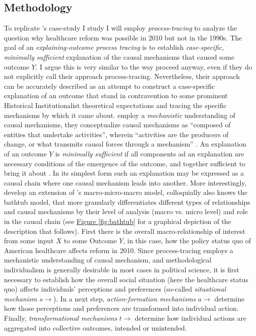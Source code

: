 \documentclass[11pt]{article}
\begin{document}
\subsection*{Methodology}

To replicate \citeauthor{Jacobs2014}'s \parencite*{Jacobs2014} case-study I study I will employ \textit{process-tracing} to analyze the question why healthcare reform was possible in 2010 but not in the 1990s. The goal of an \textit{explaining-outcome process tracing} \parencite[][]{Beach2019} is to establish \textit{case-specific}, \textit{minimally sufficient} explanation of the causal mechanisms that caused some outcome $Y$. I argue this is very similar to the way \textcite[][]{Jacobs2014} proceed anyway, even if they do not explicitly call their approach process-tracing. Nevertheless, their approach can be accurately described as an attempt to construct a case-specific explanation of an outcome that stand in contravention to some prominent Historical Institutionalist theoretical expectations and tracing the specific mechanisms by which it came about. \textcite[][]{Beach2019} employ a \textit{mechanistic} understanding of causal mechanisms, they conceptualize causal mechanisms as  \enquote{composed of entities that undertake activities}, wherein \enquote{activities are the producers of change, or what transmits causal forces through a mechanism} . An explanation of an outcome $Y$ is \textit{minimally sufficient} if all components ad an explanation are necessary conditions of the emergence of the outcome, and together sufficient to bring it about \parencite[see e.g.][]{Goertz2007}. In its simplest form such an explanation may be expressed as a causal chain where one causal mechanism leads into another. More interestingly, \textcite[][]{Hedström1998} develop an extension of \citeauthor[][]{Coleman1986}'s \parencite*{Coleman1986} macro-micro-macro model, colloquially also knows the bathtub model, that more granularly differentiates different types of relationships and causal mechanisms by their level of analysis (macro vs. micro level) and role in the causal chain (see \hyperref[fig:bathtub]{Figure \ref*{fig:bathtub}} for a graphical depiction of the description that follows). First there is the overall macro-relationship of interest from some input $X$ to some Outcome $Y$, in this case, how the policy status quo of American healthcare affects reform in 2010. Since process-tracing employs a mechanistic understanding of causal mechanism, and methodological individualism is generally desirable in most cases in political science, it is first necessary to establish how the overall social situation (here the healthcare status quo) affects individuals' perceptions and preferences (so-called \textit{situational mechanism $s\to$}). In a next step, \textit{action-formation mechanisms} $a\to$ determine how those perceptions and preferences are transformed into individual action. Finally, \textit{transformational mechanisms} $t\to$ determine how individual actions are aggregated into collective outcomes, intended or unintended.
\end{document}
